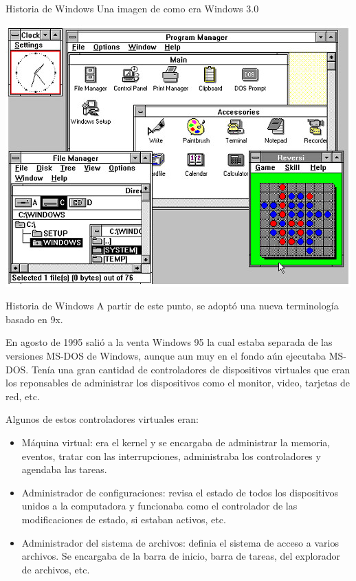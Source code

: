 \documentclass[11pt]{beamer}
\begin{document}
		\begin{frame}{Historia de Windows}
			Una imagen de como era Windows 3.0
			
			\includegraphics[scale=0.6]{w3.jpg}
		\end{frame}
		\begin{frame}{Historia de Windows}
			\small
			A partir de este punto, se adoptó una nueva terminología basado en 9x.
			
			En agosto de 1995 salió a la venta Windows 95 la cual estaba separada de las versiones MS-DOS de Windows, aunque aun muy en el fondo aún ejecutaba MS-DOS. Tenía una gran cantidad de controladores de dispositivos virtuales que eran los reponsables de administrar los dispositivos como el monitor, video, tarjetas de red, etc.
			
			Algunos de estos controladores virtuales eran:
			\begin{itemize}
				\item	Máquina virtual: era el kernel y se encargaba de administrar la memoria, eventos, tratar con las interrupciones, administraba los controladores y agendaba las tareas.
				\item Administrador de configuraciones: revisa el estado de todos los dispositivos unidos a la computadora y funcionaba como el controlador de las modificaciones de estado, si estaban activos, etc.
				\item Administrador del sistema de archivos: definia el sistema de acceso a varios archivos. Se encargaba de la barra de inicio, barra de tareas, del explorador de archivos, etc.
			\end{itemize}
		\end{frame}
\end{document}

